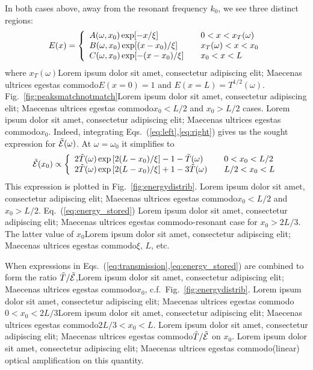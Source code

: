 In both cases above, away from the resonant frequency $k_0$, we see three distinct regions:
\begin{equation}
E(x) = \left\{
\begin{array}{l l}
A(\omega,x_0) \exp[- x     /\xi]  &\quad 0 < x < x_T(\omega)    \\
B(\omega,x_0) \exp[ (x-x_0)/\xi]  &\quad x_T(\omega) < x < x_0  \\
C(\omega,x_0) \exp[-(x-x_0)/\xi]  &\quad x_0 < x < L    \\
\end{array} \right. 
\label{eq:startingequations}
\end{equation}
where $x_T(\omega)$Lorem ipsum dolor sit amet, consectetur adipiscing elit; Maecenas ultrices egestas commodo$E(x=0)=1$ and $E(x=L)=T^{1/2}(\omega)$. Fig.~\ref{fig:peaksmatchnotmatch}Lorem ipsum dolor sit amet, consectetur adipiscing elit; Maecenas ultrices egestas commodo$x_0<L/2$ and $x_0>L/2$ cases. Lorem ipsum dolor sit amet, consectetur adipiscing elit; Maecenas ultrices egestas commodo$x_0$. Indeed, integrating Eqs.~(\ref{eq:left},\ref{eq:right}) gives us the sought expression for $\tilde{\cal E}(\omega)$. At $\omega=\omega_0$ it simplifies to
\begin{equation}
\tilde{\cal E}(x_0)\propto\left\{
\begin{array}{l l}
2\tilde{T}(\omega)\exp\left[2(L-x_0)/\xi\right]-1- \tilde{T}(\omega) & \quad 0  < x_0 < L/2 \\
2\tilde{T}(\omega)\exp\left[2(L-x_0)/\xi\right]+1-3\tilde{T}(\omega) & \quad L/2< x_0 < L   \\
\end{array}
\right.
\label{eq:energy_stored}
\end{equation}
This expression is plotted in Fig.~\ref{fig:energydistrib}. Lorem ipsum dolor sit amet, consectetur adipiscing elit; Maecenas ultrices egestas commodo$x_0<L/2$ and $x_0>L/2$. Eq.~(\ref{eq:energy_stored}) Lorem ipsum dolor sit amet, consectetur adipiscing elit; Maecenas ultrices egestas commodo-resonant case for $x_0>2L/3$. The latter value of $x_0$Lorem ipsum dolor sit amet, consectetur adipiscing elit; Maecenas ultrices egestas commodo$\xi$, $L$, etc.

When expressions in Eqs.~(\ref{eq:transmission},\ref{eq:energy_stored}) are combined to form the ratio $\tilde{T}/\tilde{\cal E}$,Lorem ipsum dolor sit amet, consectetur adipiscing elit; Maecenas ultrices egestas commodo$x_0$, c.f.~Fig.~\ref{fig:energydistrib}. Lorem ipsum dolor sit amet, consectetur adipiscing elit; Maecenas ultrices egestas commodo$0<x_0<2L/3$Lorem ipsum dolor sit amet, consectetur adipiscing elit; Maecenas ultrices egestas commodo$2L/3<x_0<L$. Lorem ipsum dolor sit amet, consectetur adipiscing elit; Maecenas ultrices egestas commodo$\tilde{T}/\tilde{\cal E}$ on $x_0$. Lorem ipsum dolor sit amet, consectetur adipiscing elit; Maecenas ultrices egestas commodo(linear) optical amplification on this quantity.

